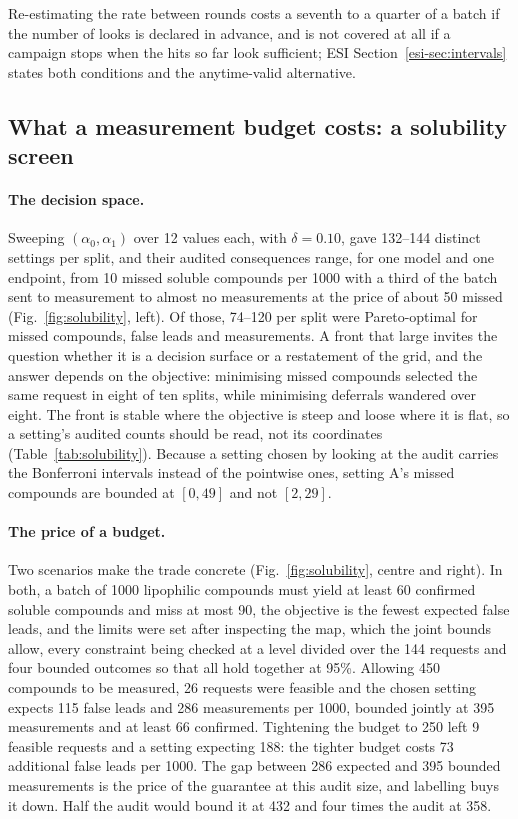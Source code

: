 \documentclass[twocolumn,10pt]{article}
\begin{document}
Re-estimating the rate between rounds costs a seventh to a
quarter of a batch if the number of looks is declared in advance, and is not covered at all if
a campaign stops when the hits so far look sufficient; ESI
Section~\ref{esi-sec:intervals} states both conditions and the anytime-valid alternative.

\subsection{What a measurement budget costs: a solubility screen}
\label{sec:results:solubility}

\paragraph{The decision space.} Sweeping $(\alpha_0,\alpha_1)$ over 12 values each, with
$\delta=0.10$, gave 132--144 distinct settings per split, and their audited consequences range,
for one model and one endpoint, from 10 missed soluble compounds per 1000 with a third of the
batch sent to measurement to almost no measurements at the price of about 50 missed
(Fig.~\ref{fig:solubility}, left). Of those, 74--120 per split were Pareto-optimal for missed
compounds, false leads and measurements. A front that large invites the question whether it is a
decision surface or a restatement of the grid, and the answer depends on the objective:
minimising missed compounds selected the same request in eight of ten splits, while minimising
deferrals wandered over eight. The front is stable where the objective is steep and loose where
it is flat, so a setting's audited counts should be read, not its coordinates
(Table~\ref{tab:solubility}). Because a setting chosen by looking at the audit carries the Bonferroni intervals instead of the pointwise ones, setting A's missed compounds are bounded at
$[0,49]$ and not $[2,29]$.

\paragraph{The price of a budget.} Two scenarios make the trade concrete
(Fig.~\ref{fig:solubility}, centre and right). In both, a batch of 1000 lipophilic compounds must
yield at least 60 confirmed soluble compounds and miss at most 90, the objective is the fewest
expected false leads, and the limits were set after inspecting the map, which the joint bounds allow, every constraint being checked at a level divided over the 144 requests and four bounded
outcomes so that all hold together at 95\%. Allowing 450 compounds to be measured, 26 requests
were feasible and the chosen setting expects 115 false leads and 286 measurements per 1000,
bounded jointly at 395 measurements and at least 66 confirmed. Tightening the budget to 250 left
9 feasible requests and a setting expecting 188: the tighter budget costs 73 additional false
leads per 1000. The gap between 286 expected and 395 bounded measurements is the price of the
guarantee at this audit size, and labelling buys it down. Half the audit would bound it at 432 and four times the audit at 358.
\end{document}
